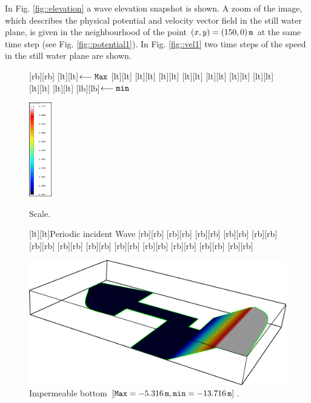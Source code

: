 In Fig. \ref{fig::elevation} 
a wave elevation  snapshot is shown.  
 A zoom of the image, which  describes
the physical potential and velocity vector field in the still
water plane, is given in  the neighbourhood of  the
point \((x,y)=(150,0)\,{\tt m}\) at the same time step (see Fig. \ref{fig::potential1}).
In Fig. \ref{fig::vel1}  two time steps of the
speed in the still water plane are shown. 
\begin{figure}[!htb]
\begin{minipage}[t]{0.3\linewidth}
[rb][rb]{}
[lt][lt]{\(\longleftarrow\tt Max\)}
[lt][lt]{}
[lt][lt]{}
[lt][lt]{}
[lt][lt]{}
[lt][lt]{}
[lt][lt]{}
[lt][lt]{}
[lt][lt]{}
[lt][lt]{}
[lb][lb]{\(\longleftarrow\tt min\)}
{\centering
\includegraphics[height=4.1cm]{chapters/lopes/eps/table.eps}
\caption{Scale.}\label{fig::scale}\par}
\end{minipage}\hfill
\begin{minipage}[t]{0.6\linewidth}
[lt][lt]{Periodic incident Wave}
[rb][rb]{}
[rb][rb]{}
[rb][rb]{}
[rb][rb]{}
[rb][rb]{}
[rb][rb]{}
[rb][rb]{}
[rb][rb]{}
[rb][rb]{}
[rb][rb]{}
[rb][rb]{}
[rb][rb]{}
[rb][rb]{}
{\centering     
\includegraphics[width=\linewidth]{chapters/lopes/eps/depth.eps}
\caption{Impermeable bottom \newline \([{\tt Max}=-5.316\,{\tt m},{\tt min}=-13.716\,{\tt m}]\).}
\label{fig::harbour_depth}\par}
\end{minipage}
\end{figure}
